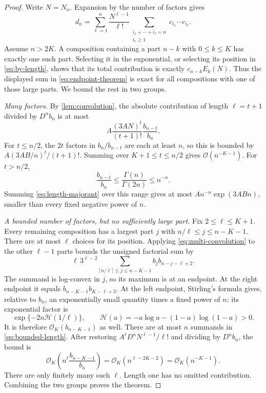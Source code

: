 \documentclass[11pt,a4paper]{article}
\theoremstyle{definition}
\numberwithin{equation}{section}
\newcommand{\Oh}{\mathcal O}
\begin{document}
\begin{proof}
Write $N=N_n$. Expansion by the number of factors gives
\begin{equation}
 d_n=\sum_{\ell=1}^{n}\frac{N^{\ell-1}}{\ell!}
       \sum_{\substack{i_1+\cdots+i_\ell=n\\ i_r\ge1}}
          c_{i_1}\cdots c_{i_\ell}.
 \label{eq:by-length}
\end{equation}
Assume $n>2K$. A composition containing a part $n-k$ with $0\le k\le K$ has exactly one such part. Selecting it in the exponential, or selecting its position in \eqref{eq:by-length}, shows that its total contribution is exactly
$c_{n-k}E_k(N)$. Thus the displayed sum in \eqref{eq:endpoint-theorem} is exact for all compositions with one of those large parts. We bound the rest in two groups.

\emph{Many factors.} By \cref{lem:convolution}, the absolute contribution of length $\ell=t+1$ divided by $D^nb_n$ is at most
\begin{equation}
 A\frac{(3AN)^t}{(t+1)!}\frac{b_{n-t}}{b_n}.
 \label{eq:length-majorant}
\end{equation}
For $t\le n/2$, the $2t$ factors in $b_n/b_{n-t}$ are each at least $n$, so this is bounded by
$A(3AB/n)^t/(t+1)!$. Summing over $K+1\le t\le n/2$ gives $\Oh(n^{-K-1})$. For $t>n/2$,
\[
 \frac{b_{n-t}}{b_n}\le\frac{\Gamma(n)}{\Gamma(2n)}\le n^{-n}.
\]
Summing \eqref{eq:length-majorant} over this range gives at most
$A n^{-n}\exp(3ABn)$, smaller than every fixed negative power of $n$.

\emph{A bounded number of factors, but no sufficiently large part.}
Fix $2\le\ell\le K+1$. Every remaining composition has a largest part $j$ with
$n/\ell\le j\le n-K-1$. There are at most $\ell$ choices for its position. Applying \eqref{eq:multi-convolution} to the other $\ell-1$ parts bounds the unsigned factorial sum by
\begin{equation}
 \ell\,3^{\ell-2}
   \sum_{\lceil n/\ell\rceil\le j\le n-K-1}
       b_jb_{n-j-\ell+2}.
 \label{eq:bounded-length}
\end{equation}
The summand is log-convex in $j$, so its maximum is at an endpoint. At the right endpoint it equals
$b_{n-K-1}b_{K-\ell+3}$. At the left endpoint, Stirling's formula gives, relative to $b_n$, an exponentially small quantity times a fixed power of $n$: its exponential factor is
\[
 \exp\{-2n\mathcal H(1/\ell)\},\qquad
 \mathcal H(a)=-a\log a-(1-a)\log(1-a)>0.
\]
It is therefore $\Oh_K(b_{n-K-1})$ as well. There are at most $n$ summands in \eqref{eq:bounded-length}. After restoring $A^\ell D^nN^{\ell-1}/\ell!$ and dividing by $D^nb_n$, the bound is
\[
 \Oh_K\!\left(n^\ell\frac{b_{n-K-1}}{b_n}\right)
 =\Oh_K(n^{\ell-2K-2})=\Oh_K(n^{-K-1}).
\]
There are only finitely many such $\ell$. Length one has no omitted contribution. Combining the two groups proves the theorem.
\end{proof}
\end{document}
